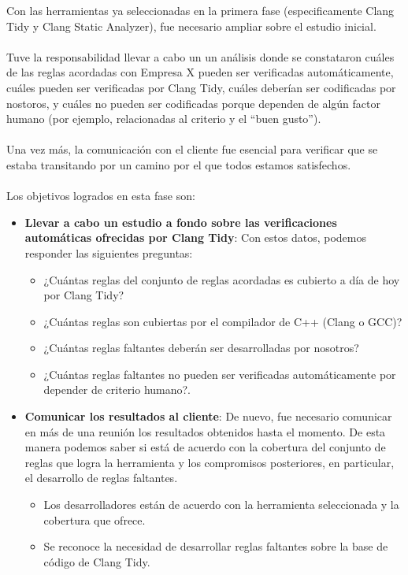 \documentclass[12pt]{extreport} %
\begin{document}
Con las herramientas ya seleccionadas en la primera fase
(especificamente Clang Tidy y Clang Static Analyzer), fue necesario
ampliar sobre el estudio inicial.

\paragraph{}
Tuve la responsabilidad llevar a cabo un un análisis donde se
constataron cuáles de las reglas acordadas con Empresa X pueden ser
verificadas automáticamente, cuáles pueden ser verificadas por Clang
Tidy, cuáles deberían ser codificadas por nostoros, y cuáles no pueden
ser codificadas porque dependen de algún factor humano (por ejemplo,
relacionadas al criterio y el ``buen gusto'').

\paragraph{}
Una vez más, la comunicación con el cliente fue esencial para
verificar que se estaba transitando por un camino por el que todos
estamos satisfechos.

\paragraph{}
Los objetivos logrados en esta fase son:
\begin{itemize}
\item \textbf{Llevar a cabo un estudio a fondo sobre las
  verificaciones automáticas ofrecidas por Clang Tidy}: Con estos
  datos, podemos responder las siguientes preguntas:
  \begin{itemize}
  \item ¿Cuántas reglas del conjunto de reglas acordadas es cubierto a
    día de hoy por Clang Tidy?
  \item ¿Cuántas reglas son cubiertas por el compilador de C++ (Clang o GCC)?
  \item ¿Cuántas reglas faltantes deberán ser desarrolladas por nosotros?
  \item ¿Cuántas reglas faltantes no pueden ser verificadas
    automáticamente por depender de criterio humano?.
  \end{itemize}

\item \textbf{Comunicar los resultados al cliente}: De nuevo, fue
  necesario comunicar en más de una reunión los resultados obtenidos
  hasta el momento. De esta manera podemos saber si está de acuerdo
  con la cobertura del conjunto de reglas que logra la herramienta y
  los compromisos posteriores, en particular, el desarrollo de reglas
  faltantes.
  \begin{itemize}
  \item Los desarrolladores están de acuerdo con la herramienta
    seleccionada y la cobertura que ofrece.
  \item Se reconoce la necesidad de desarrollar reglas faltantes sobre
    la base de código de Clang Tidy.
  \end{itemize}
\end{itemize}
\end{document}
